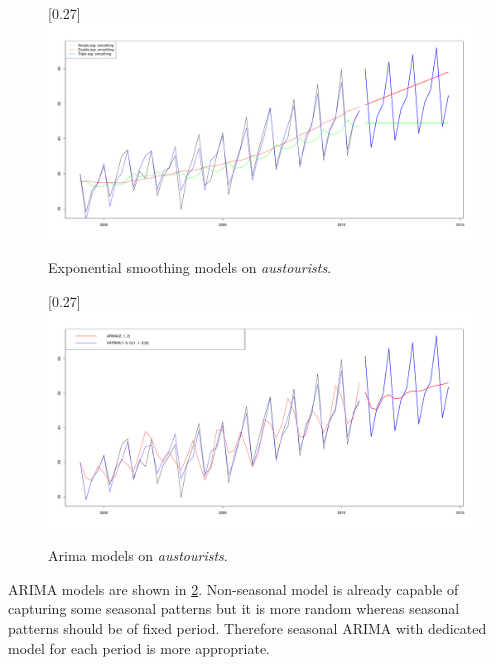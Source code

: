     \begin{figure}[H]
        \begin{center}
            \scalebox{0.255}[0.27]{\includegraphics{img/exp-smoothings.pdf}}
            \caption{Exponential smoothing models on \emph{austourists}.}
            \label{img:exp-smoothings}
        \end{center}
    \end{figure}

    \begin{figure}[H]
        \begin{center}
            \scalebox{0.255}[0.27]{\includegraphics{img/arima-sarima.pdf}}
            \caption{Arima models on \emph{austourists}.}
            \label{img:arimas}
        \end{center}
    \end{figure}

    ARIMA models are shown in \ref{img:arimas}. Non-seasonal model is already capable of capturing some seasonal
    patterns but it is more random whereas seasonal patterns should be of fixed period. Therefore seasonal ARIMA with
    dedicated model for each period is more appropriate.


